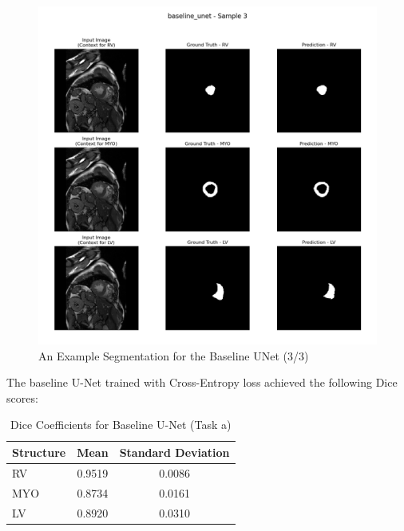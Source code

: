 \documentclass{article}
\begin{document}
\begin{figure}[H]
  \centering
  \includegraphics[width=\linewidth]{../result/baseline_unet/sample_3_segmentation.png}
  \caption{An Example Segmentation for the Baseline UNet (3/3)}
  \label{fig:baseline_unet_segmentation_example3}
\end{figure}

The baseline U-Net trained with Cross-Entropy loss achieved the following Dice scores:
\begin{table}[H]
  \centering
  \caption{Dice Coefficients for Baseline U-Net (Task a)}
  \label{tab:baseline_unet}
  \begin{tabular}{lcc}
    \toprule
    Structure & Mean   & Standard Deviation \\
    \midrule
    RV        & 0.9519 & 0.0086             \\
    MYO       & 0.8734 & 0.0161             \\
    LV        & 0.8920 & 0.0310             \\
    \bottomrule
  \end{tabular}
\end{table}
\end{document}
